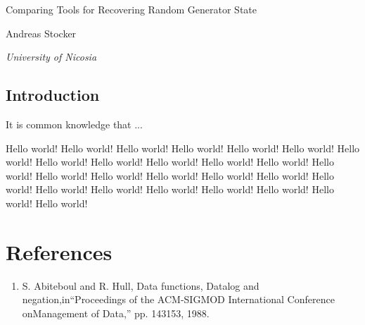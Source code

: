 \documentclass{article}
\begin{document}
    \begin{center}
    \end{center}
    
    \addvspace{20mm}
        
    \begin{center}
        \huge Comparing Tools for Recovering Random Generator State
    \end{center}
    
    \begin{center}
    \end{center}
       
    \begin{center}
        \large Andreas Stocker
    \end{center}
    
    \begin{center}
        \small \emph {University of Nicosia}
    \end{center}

    \addvspace{15mm}

    \begin{multicols}{2}


    \section{Introduction}
It is common knowledge that ...

Hello world!
Hello world!
Hello world!
Hello world!
Hello world!
Hello world!
Hello world!
Hello world!
Hello world!
Hello world!
Hello world!
Hello world!
Hello world!
Hello world!
Hello world!
Hello world!
Hello world!
Hello world!
Hello world!
Hello world!
Hello world!
Hello world!
Hello world!
Hello world!
Hello world!
Hello world!
    \end{multicols}

    \break
    \section*{References}

    \begin{enumerate}

    \item S.  Abiteboul  and  R.  Hull,  Data  functions,  Datalog  and  negation,in``Proceedings  of  the  ACM-SIGMOD  International  Conference  onManagement of Data,'' pp. 143153, 1988.

    \end{enumerate}
    
\end{document}
